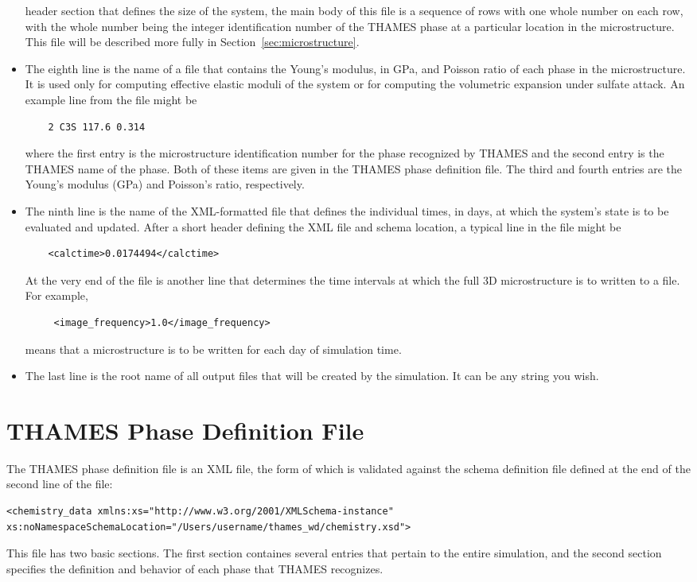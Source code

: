 \documentclass{article}
\begin{document}
\begin{itemize}
	header section that defines the size of the system, the main body of this
	file is a sequence of rows with one whole number on each row, with the whole
	number being the integer identification number of the THAMES phase at a
	particular location in the microstructure.  This file will be described more
	fully in Section~\ref{sec:microstructure}.
	\item The eighth line is the name of a file that contains the Young's
	modulus, in \si{\giga\pascal}, and Poisson ratio of each phase in the
	microstructure.  It is used only for computing effective elastic moduli
	of the system or for computing the volumetric expansion under sulfate
	attack.  An example line from the file might be
	\begin{lstlisting}
	2 C3S 117.6 0.314
	\end{lstlisting}
	where the first entry is the microstructure identification number for the
	phase recognized by THAMES and the second entry is the THAMES name of the phase.
	Both of these items are given in the THAMES phase definition file.  The
	third and fourth entries are the Young's modulus (\si{\giga\pascal}) and
	Poisson's ratio, respectively.
	\item The ninth line is the name of the XML-formatted file that defines
	the individual times, in days, at which the system's state is to be evaluated
	and updated.  After a short header defining the XML file and schema
	location, a typical line in the file might be

	\lstset{language=XML}
	\begin{lstlisting}
	<calctime>0.0174494</calctime>
	\end{lstlisting}
	At the very end of the file is another line that determines the time
	intervals at which the full 3D microstructure is to written to a file.
	For example,
	\begin{lstlisting}
	 <image_frequency>1.0</image_frequency>
	\end{lstlisting}
	means that a microstructure is to be written for each day of simulation
	time.
	\item The last line is the root name of all output files that will be
	created by the simulation.  It can be any string you wish.
	\end{itemize}

\section{\label{sec:phasedefinitions} THAMES Phase Definition File}
The THAMES phase definition file is an XML file, the form of which
is validated against the schema definition file defined at the end of
the second line of the file:
\begin{lstlisting}
<chemistry_data xmlns:xs="http://www.w3.org/2001/XMLSchema-instance"
xs:noNamespaceSchemaLocation="/Users/username/thames_wd/chemistry.xsd">
\end{lstlisting}
This file has two basic sections.  The first section containes several entries
that pertain to the entire simulation, and the second section specifies
the definition and behavior of each phase that THAMES recognizes.
\end{document}
